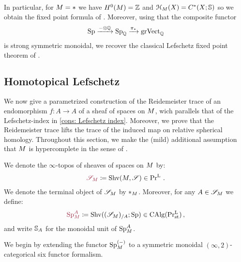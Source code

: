 In particular, for $M = \ast$ we have $H^0(M)=\mathbb{Z}$ and $\cptSec{X}[\base]=C^*(X;\SS)$ 
so we obtain the fixed point formula of \cite{Dold_Puppe1980}.
Moreover, using that the composite functor 
\[ \operatorname{Sp} \xrightarrow{-\otimes \mathbb{Q}} \operatorname{Sp}_{\mathbb{Q}} \xrightarrow{\pi_{*}} \mathrm{grVect}_{\mathbb{Q}}\]
is strong symmetric monoidal, we recover the classical Lefschetz fixed 
point theorem of \cite{Lefschetz1937}. 

\subsection{Homotopical Lefschetz}\label{subsec: homotopical lefschetz}

We now give a parametrized construction of the Reidemeister trace \cite{Reidemeister1936}
of an endomorphism $f\colon A\to A$ of a sheaf of spaces on $M$, 
wich parallels that of the Lefschetz-index in \cref{cons: Lefschetz index}. 
Moreover, we prove that the Reidemeister trace lifts the trace of the 
induced map on relative spherical homology. 
Throughout this section, we make the (mild) additional assumption that $M$ is hypercomplete
in the sense of .

\begin{defn}
    We denote the $\infty$-topos of sheaves of spaces on $M$ by:
    \[\mdef{\pSpc{\base}}\coloneq \Shv(\base,\Spc) \in \Prl\,.\]
    We denote the terminal object of $\mathscr{S}_{M}$ by $\ast_{M}$. 
    Moreover, for any $A\in \mathscr{S}_{M}$ we define:
    \[ \mdef{\pSp{\base}[A]}\coloneq \Shv((\pSpc{\base})_{/A};\Sp)\in \CAlg(\Prlst)\,, \]
    and write $\mathbb{S}_{A}$ for the monoidal unit of $\pSp{\base}[A]$.
\end{defn}

We begin by extending the functor $\pSp{\base}[(-)]$ to a symmetric monoidal 
$(\infty,2)$-categorical six functor formalism.

